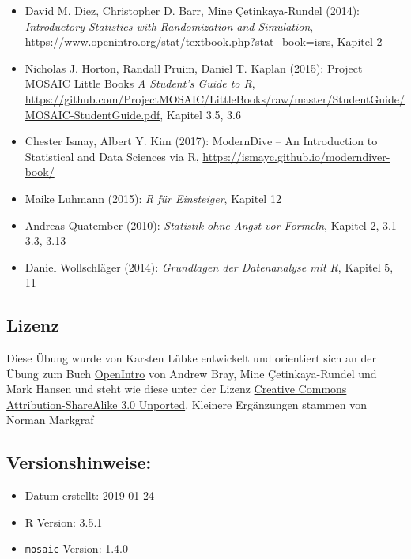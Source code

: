 \documentclass[12pt,ngerman,paper=a4,pagesize,DIV=13]{scrreprt}
\providecommand{\tightlist}{%
  \setlength{\itemsep}{0pt}\setlength{\parskip}{0pt}}
\begin{document}
\begin{itemize}
\tightlist
\item
  David M. Diez, Christopher D. Barr, Mine Çetinkaya-Rundel (2014):
  \emph{Introductory Statistics with Randomization and Simulation},
  \url{https://www.openintro.org/stat/textbook.php?stat_book=isrs},
  Kapitel 2
\item
  Nicholas J. Horton, Randall Pruim, Daniel T. Kaplan (2015): Project
  MOSAIC Little Books \emph{A Student's Guide to R},
  \url{https://github.com/ProjectMOSAIC/LittleBooks/raw/master/StudentGuide/MOSAIC-StudentGuide.pdf},
  Kapitel 3.5, 3.6
\item
  Chester Ismay, Albert Y. Kim (2017): ModernDive -- An Introduction to
  Statistical and Data Sciences via R,
  \url{https://ismayc.github.io/moderndiver-book/}
\item
  Maike Luhmann (2015): \emph{R für Einsteiger}, Kapitel 12
\item
  Andreas Quatember (2010): \emph{Statistik ohne Angst vor Formeln},
  Kapitel 2, 3.1-3.3, 3.13
\item
  Daniel Wollschläger (2014): \emph{Grundlagen der Datenanalyse mit R},
  Kapitel 5, 11
\end{itemize}

\hypertarget{lizenz-2}{%
\subsection{Lizenz}\label{lizenz-2}}

Diese Übung wurde von Karsten Lübke entwickelt und orientiert sich an
der Übung zum Buch
\href{https://www.openintro.org/stat/index.php?stat_book=isrs}{OpenIntro}
von Andrew Bray, Mine Çetinkaya-Rundel und Mark Hansen und steht wie
diese unter der Lizenz
\href{http://creativecommons.org/licenses/by-sa/3.0}{Creative Commons
Attribution-ShareAlike 3.0 Unported}. Kleinere Ergänzungen stammen von
Norman Markgraf

\hypertarget{versionshinweise-2}{%
\subsection{Versionshinweise:}\label{versionshinweise-2}}

\begin{itemize}
\tightlist
\item
  Datum erstellt: 2019-01-24
\item
  R Version: 3.5.1
\item
  \texttt{mosaic} Version: 1.4.0
\end{itemize}
\end{document}

